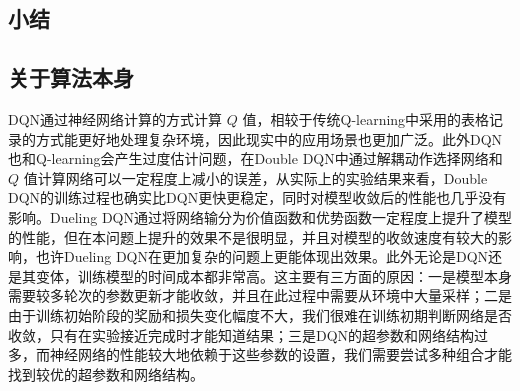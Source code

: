 \documentclass[a4paper,12pt]{article}
\begin{document}
\begin{CJK}{UTF8}{gbsn}
\section{小结}
\subsection{关于算法本身}
DQN通过神经网络计算的方式计算 $Q$ 值，相较于传统Q-learning中采用的表格记录的方式能更好地处理复杂环境，因此现实中的应用场景也更加广泛。此外DQN也和Q-learning会产生过度估计问题，在Double DQN中通过解耦动作选择网络和 $Q$ 值计算网络可以一定程度上减小的误差，从实际上的实验结果来看，Double DQN的训练过程也确实比DQN更快更稳定，同时对模型收敛后的性能也几乎没有影响。Dueling DQN通过将网络输分为价值函数和优势函数一定程度上提升了模型的性能，但在本问题上提升的效果不是很明显，并且对模型的收敛速度有较大的影响，也许Dueling DQN在更加复杂的问题上更能体现出效果。此外无论是DQN还是其变体，训练模型的时间成本都非常高。这主要有三方面的原因：一是模型本身需要较多轮次的参数更新才能收敛，并且在此过程中需要从环境中大量采样；二是由于训练初始阶段的奖励和损失变化幅度不大，我们很难在训练初期判断网络是否收敛，只有在实验接近完成时才能知道结果；三是DQN的超参数和网络结构过多，而神经网络的性能较大地依赖于这些参数的设置，我们需要尝试多种组合才能找到较优的超参数和网络结构。

\end{CJK}
\end{document}
